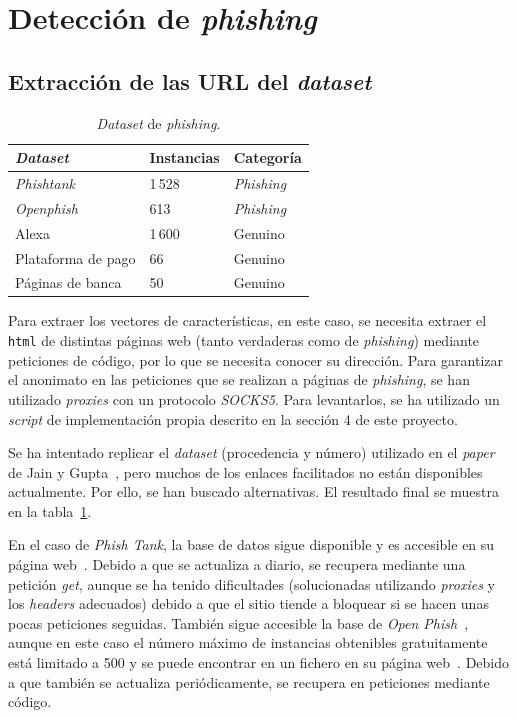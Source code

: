 \section{Detección de \textit{phishing}}

\subsection{Extracción de las URL del \textit{dataset}}

\begin{table}
	\begin{centering}
		\begin{tabular}{@{} p{14em} p{6em} p{6em}@{}}
			\toprule
			\textbf{\textit{Dataset}} & \textbf{Instancias} &  \textbf{Categoría} \\ \midrule
			\textit{Phishtank} & 1\,528 & \textit{Phishing}\\
			\textit{Openphish} & 613 & \textit{Phishing}\\
			Alexa & 1\,600 & Genuino\\
			Plataforma de pago & 66 & Genuino\\
			Páginas de banca & 50 & Genuino\\
			\bottomrule
		\end{tabular}
		\caption{\textit{Dataset} de \textit{phishing}.}
		\label{tbl:dataset_phishing}	
	\end{centering}
\end{table}

Para extraer los vectores de características, en este caso, se necesita extraer el \texttt{html} de distintas páginas web (tanto verdaderas como de \textit{phishing}) mediante peticiones de código, por lo que se necesita conocer su dirección. Para garantizar el anonimato en las peticiones que se realizan a páginas de \textit{phishing}, se han utilizado \textit{proxies} con un protocolo \textit{SOCKS5}. Para levantarlos, se ha utilizado un \textit{script} de implementación propia descrito en la sección 4 de este proyecto.

Se ha intentado replicar el \textit{dataset} (procedencia y número) utilizado en el \textit{paper} de Jain y Gupta~\cite{featuresPhishing2018Gupta}, pero muchos de los enlaces facilitados no están disponibles actualmente. Por ello, se han buscado alternativas. El resultado final se muestra en la tabla~\ref{tbl:dataset_phishing}.

En el caso de \textit{Phish Tank}, la base de datos sigue disponible y es accesible en su página web~\cite{phishTankDB}. Debido a que se actualiza a diario, se recupera mediante una petición \textit{get}, aunque se ha tenido dificultades (solucionadas utilizando \textit{proxies} y los \textit{headers} adecuados) debido a que el sitio tiende a bloquear si se hacen unas pocas peticiones seguidas. También sigue accesible la base de \textit{Open Phish}~\cite{openFishDB}, aunque en este caso el número máximo de instancias obtenibles gratuitamente está limitado a 500 y se puede encontrar en un fichero en su página web~\cite{openFishFile}. Debido a que también se actualiza periódicamente, se recupera en peticiones mediante código.

